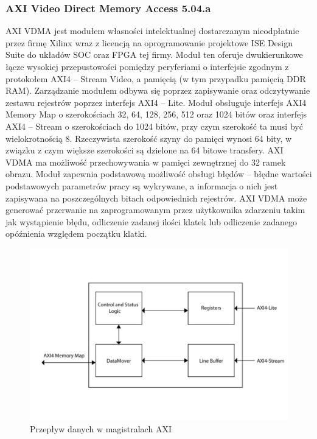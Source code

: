 \documentclass[a4paper,11pt,oneside]{book}  %
\begin{document}
\subsubsection{AXI Video Direct Memory Access 5.04.a}
AXI VDMA jest modułem własności intelektualnej dostarczanym nieodpłatnie przez firmę Xilinx wraz z licencją na oprogramowanie projektowe ISE Design Suite do układów SOC oraz FPGA tej firmy. Moduł ten oferuje dwukierunkowe łącze wysokiej przepustowości pomiędzy peryferiami o interfejsie zgodnym z protokołem AXI4 – Stream Video, a pamięcią (w tym przypadku pamięcią DDR RAM). Zarządzanie modułem odbywa się poprzez zapisywanie oraz odczytywanie zestawu rejestrów poprzez interfejs AXI4 – Lite. Moduł obsługuje interfejs AXI4 Memory Map o szerokościach 32, 64, 128, 256, 512 oraz 1024 bitów oraz interfejs AXI4 – Stream o szerokościach do 1024 bitów, przy czym szerokość ta musi być wielokrotnością 8. Rzeczywista szerokość szyny do pamięci wynosi 64 bity, w związku z czym większe szerokości są dzielone na 64 bitowe transfery. AXI VDMA ma możliwość przechowywania w pamięci zewnętrznej do 32 ramek obrazu. Moduł zapewnia podstawową możliwość obsługi błędów – błędne wartości podstawowych parametrów pracy są wykrywane, a informacja o nich jest zapisywana na poszczególnych bitach odpowiednich rejestrów. AXI VDMA może generować przerwanie na zaprogramowanym przez użytkownika zdarzeniu takim jak wystąpienie błędu, odliczenie zadanej ilości klatek lub odliczenie zadanego opóźnienia względem początku klatki.

\begin{figure}[H]
	\centering
	\includegraphics[width=14cm]{data3.png}
	\caption{Przepływ danych w magistralach AXI}
	\label{fig:Zynq3}
\end{figure}
\end{document}
